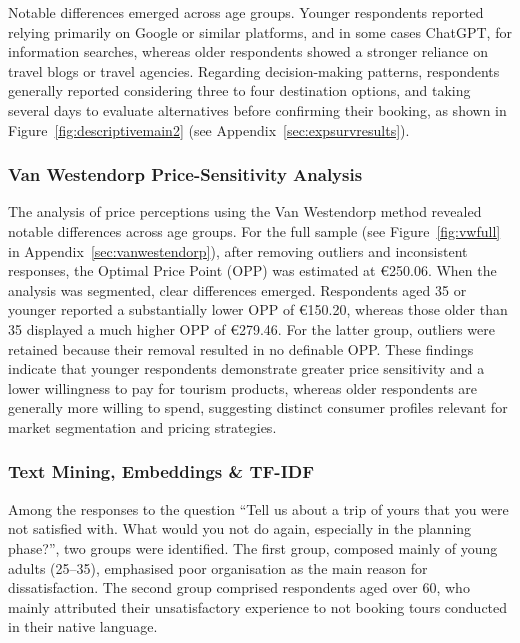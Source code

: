 \documentclass[a4paper, 12pt, twoside]{report}  %
\begin{document}
\indent Notable differences emerged across age groups. Younger respondents reported relying primarily on Google or similar platforms, and in some cases ChatGPT, for information searches, whereas older respondents showed a stronger reliance on travel blogs or travel agencies. Regarding decision-making patterns, respondents generally reported considering three to four destination options, and taking several days to evaluate alternatives before confirming their booking, as shown in Figure~\ref{fig:descriptivemain2} (see Appendix~\ref{sec:expsurvresults}).


\subsubsection{Van Westendorp Price-Sensitivity Analysis}

\indent The analysis of price perceptions using the Van Westendorp method revealed notable differences across age groups. For the full sample (see Figure~\ref{fig:vwfull} in Appendix~\ref{sec:vanwestendorp}), after removing outliers and inconsistent responses, the Optimal Price Point (OPP) was estimated at €250.06. When the analysis was segmented, clear differences emerged. Respondents aged 35 or younger reported a substantially lower OPP of €150.20, whereas those older than 35 displayed a much higher OPP of €279.46. For the latter group, outliers were retained because their removal resulted in no definable OPP. These findings indicate that younger respondents demonstrate greater price sensitivity and a lower willingness to pay for tourism products, whereas older respondents are generally more willing to spend, suggesting distinct consumer profiles relevant for market segmentation and pricing strategies.

\subsubsection{Text Mining, Embeddings \& TF-IDF}

\indent Among the responses to the question “Tell us about a trip of yours that you were not satisfied with. What would you not do again, especially in the planning phase?”, two groups were identified. The first group, composed mainly of young adults (25–35), emphasised poor organisation as the main reason for dissatisfaction. The second group comprised respondents aged over 60, who mainly attributed their unsatisfactory experience to not booking tours conducted in their native language.
\end{document}
